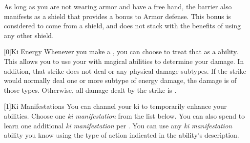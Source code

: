         As long as you are not wearing armor and have a free hand, the barrier also manifests as a shield that provides a  bonus to Armor defense.
        This bonus is considered to come from a shield, and does not stack with the benefits of using any other shield.

        [0]{Ki Energy} Whenever you make a , you can choose to treat that as a  ability.
        This allows you to use your  with magical abilities to determine your damage.
        In addition, that strike does not deal  or any physical damage subtypes.
        If the strike would normally deal one or more subtype of energy damage, the damage is of those types.
        Otherwise, all damage dealt by the strike is .

        [1]{Ki Manifestations}
        You can channel your ki to temporarily enhance your abilities.
        Choose one \textit{ki manifestation} from the list below.
        You can also spend  to learn one additional \textit{ki manifestation} per .
        You can use any \textit{ki manifestation} ability you know using the type of action indicated in the ability's description.

